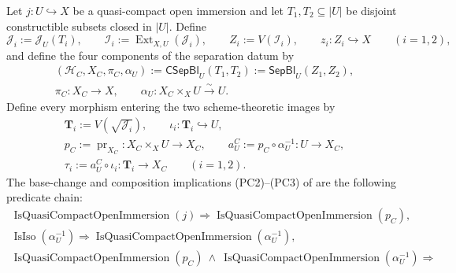 \begin{definition}
  \label{def:nagata-separate-constructible-closed}

  Let $j\colon U\hookrightarrow X$ be a quasi-compact open immersion and let
  $T_1,T_2\subseteq|U|$ be disjoint constructible subsets closed in $|U|$.
  Define
  \[
    \mathcal J_i:=\mathcal J_U(T_i),\qquad
    \mathcal I_i:=\operatorname{Ext}_{X,U}(\mathcal J_i),\qquad
    Z_i:=V(\mathcal I_i),\qquad
    z_i\colon Z_i\hookrightarrow X\qquad(i=1,2),
  \]
  and define the four components of the separation datum by
  \[
  \begin{gathered}
    (\mathcal H_C,X_C,\pi_C,\alpha_U)
      :=\mathsf{CSepBl}_U(T_1,T_2)
      :=\mathsf{SepBl}_U(Z_1,Z_2),\\
    \pi_C\colon X_C\to X,\qquad
    \alpha_U\colon X_C\times_XU\xrightarrow{\sim}U.
  \end{gathered}                                                    \tag{KCS0}
  \]
  Define every morphism entering the two scheme-theoretic images by
  \[
  \begin{gathered}
    \mathbf T_i:=V(\sqrt{\mathcal J_i}),\qquad
    \iota_i\colon\mathbf T_i\hookrightarrow U,\\
    p_C:=\operatorname{pr}_{X_C}\colon X_C\times_XU\to X_C,
    \qquad
    a_U^C:=p_C\circ\alpha_U^{-1}\colon U\to X_C,\\
    \tau_i:=a_U^C\circ\iota_i\colon\mathbf T_i\to X_C
      \qquad(i=1,2).
  \end{gathered}                                                    \tag{KCS1}
  \]
  The base-change and composition implications (PC2)--(PC3) of
   are the following predicate
  chain:
  \[
  \begin{gathered}
    \operatorname{IsQuasiCompactOpenImmersion}(j)
      \Longrightarrow
    \operatorname{IsQuasiCompactOpenImmersion}(p_C),\\
    \operatorname{IsIso}(\alpha_U^{-1})
      \Longrightarrow
    \operatorname{IsQuasiCompactOpenImmersion}(\alpha_U^{-1}),\\
    \operatorname{IsQuasiCompactOpenImmersion}(p_C)\ \wedge\
      \operatorname{IsQuasiCompactOpenImmersion}(\alpha_U^{-1})
      \Longrightarrow

\end{gathered}\]
\end{definition}
